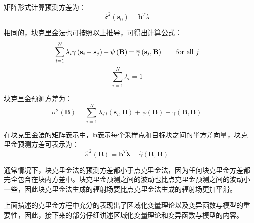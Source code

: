 矩阵形式计算预测方差为：
\begin{equation}
    \hat{\sigma}^{2} \left( \mathbf{s}_{0} \right) = \mathbf{b}^{T} \lambda
    \label{点克里金方程矩阵形式计算预测方差}
\end{equation}

相同的，块克里金法也可按照以上推导，可得出计算公式：
\begin{equation}
    \sum_{i=1}^{N} \lambda_{i} \gamma \left( \mathbf{s}_{i} - \mathbf{s}_{j} \right) + \psi \left( \mathbf{B} \right) = \overline{\gamma} \left( \mathbf{s}_{j} , \mathbf{B} \right) \qquad \text{for all $ j $}
\end{equation}
\begin{equation}
    \sum_{i=1}^{N} \lambda_{i} = 1
\end{equation}

块克里金预测方差为：
\begin{equation}
    \sigma^{2}\left( \mathbf{B} \right) = \sum_{i=1}^{N} \lambda_{i} \overline{\gamma} \left( \mathbf{s}_{i} , \mathbf{B} \right) + \psi \left( \mathbf{B} \right) - \overline{\gamma} \left( \mathbf{B} , \mathbf{B} \right)
\end{equation}

在块克里金法的矩阵表示中，$ \mathbf{b} $表示每个采样点和目标块之间的半方差向量，块克里金预测方差可表示为：
\begin{equation}
    \hat{\sigma}^{2} \left( \mathbf{B} \right) = \mathbf{b}^{T} \mathbf{\lambda} - \hat{\gamma} \left( \mathbf{B} , \mathbf{B} \right)
\end{equation}

通常情况下，块克里金法的预测方差都小于点克里金法，因为任何块克里金方差都完全包含在块内方差中。块克里金预测之间的波动也比点克里金预测之间的波动小一些，因此块克里金法生成的辐射场要比点克里金法生成的辐射场更加平滑。

上面描述的克里金方程中充分的表现出了区域化变量理论以及变异函数与模型的重要性，因此，接下来的部分仔细讲述区域化变量理论和变异函数与模型的内容。



